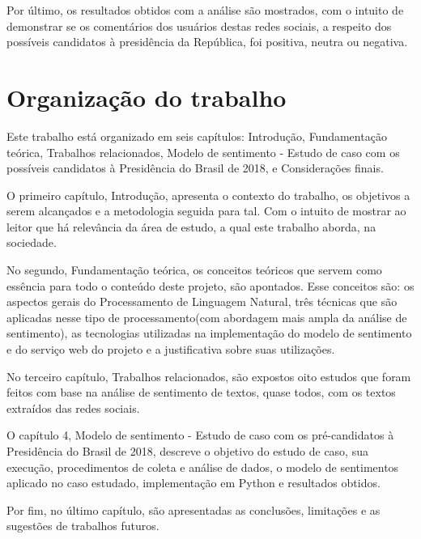 Por último, os resultados obtidos com a análise são mostrados, com o intuito de demonstrar se os comentários dos usuários destas redes sociais, a respeito dos possíveis candidatos à presidência da República, foi positiva, neutra ou negativa.

\section{Organização do trabalho}

Este trabalho está organizado em seis capítulos: Introdução, Fundamentação teórica, Trabalhos relacionados, Modelo de sentimento - Estudo de caso com os possíveis candidatos à Presidência do Brasil de 2018, e Considerações finais.

O primeiro capítulo, Introdução, apresenta o contexto do trabalho, os objetivos a serem alcançados e a metodologia seguida para tal. Com o intuito de mostrar ao leitor que há relevância da área de estudo, a qual este trabalho aborda, na sociedade.

No segundo, Fundamentação teórica, os conceitos teóricos que servem como essência para todo o conteúdo deste projeto, são apontados. Esse conceitos são: os aspectos gerais do Processamento de Linguagem Natural, três técnicas que são aplicadas nesse tipo de processamento(com abordagem mais ampla da análise de sentimento), as tecnologias utilizadas na implementação do modelo de sentimento e do serviço web do projeto e a justificativa sobre suas utilizações.

No terceiro capítulo, Trabalhos relacionados, são expostos oito estudos que foram feitos com base na análise de sentimento de textos, quase todos, com os textos extraídos das redes sociais.

O capítulo 4, Modelo de sentimento - Estudo de caso com os pré-candidatos à Presidência do Brasil de 2018, descreve o objetivo do estudo de caso, sua execução, procedimentos de coleta e análise de dados, o modelo de sentimentos aplicado no caso estudado, implementação em Python e resultados obtidos.

Por fim, no último capítulo, são apresentadas as conclusões, limitações e as sugestões de trabalhos futuros.



